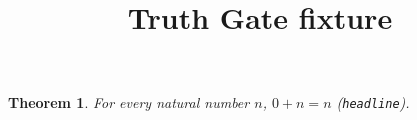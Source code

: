 \documentclass{article}
\title{Truth Gate fixture}
\newtheorem{theorem}{Theorem}
\begin{document}
\begin{theorem}\label{thm:main}
For every natural number $n$, $0 + n = n$ (\texttt{headline}).
\end{theorem}
\end{document}
